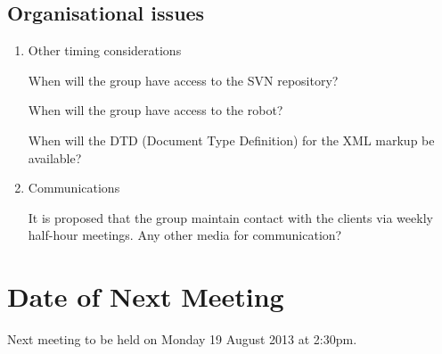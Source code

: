 \documentclass[11pt, a4paper]{article}
\begin{document}
\subsection{Organisational issues}

\begin{enumerate}

\item Other timing considerations 
\vspace*{10pt}

When will the group have access to the SVN repository?
\vspace*{10pt}

When will the group have access to the robot?
\vspace*{10pt}

When will the DTD (Document Type Definition) for the XML markup be available?
\vspace*{10pt}

\item Communications
\vspace*{10pt}

It is proposed that the group maintain contact with the clients via weekly half-hour meetings. Any other media for communication?
\end{enumerate}
\section{Date of Next Meeting}
\noindent Next meeting to be held on Monday 19 August 2013 at 2:30pm.
\end{document}
